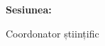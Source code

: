 \begin{titlepage}
    \begin{center}
        \large
        \MakeUppercase{\university}
        
        \LARGE
        \textbf{\MakeUppercase{\faculty}}
        
        \vspace{6cm}
        \huge
        \textbf{\thesistitle}
        
        \vspace{2cm}
        \LARGE
        \textbf{\authornamefl}
        
        \vfill
        \Large
        \textbf{Sesiunea:} \session
        
        \vspace{3cm}
        \Large
        Coordonator științific
        
        \vspace{0.5cm}
        \LARGE
        \textbf{\coordinator}
    \end{center}
\end{titlepage}